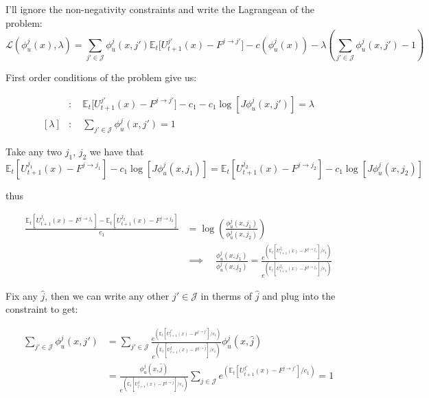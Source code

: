 \documentclass[
  letterpaper,
  DIV=11,
  numbers=noendperiod]{scrreprt}
\begin{document}
I'll ignore the non-negativity constraints and write the Lagrangean of
the problem:
\[\mathcal{L}(\phi^j_u(x), \lambda) =  \sum_{j'\in\mathcal{J}} \phi^j_u(x, j')\mathbb{E}_t\Big[U^{j'}_{t+1}(x) - F^{j \to j'}  \Big] -c(\phi^j_u(x)) - \lambda \left(\sum_{j'\in \mathcal{J}}\phi^j_u(x, j') - 1\right)\]

First order conditions of the problem give us:

\begin{align*}
  [\phi^j_u(x, j')] &:\quad \mathbb{E}_t\Big[U^{j'}_{t+1}(x) - F^{j \to j'}  \Big] - c_1 - c_1 \log[J \phi^j_u(x, j')] = \lambda \\
  [\lambda] &: \quad \sum_{j'\in \mathcal{J}}\phi^j_u(x, j') = 1
\end{align*}

Take any two \(j_1\), \(j_2\) we have that
\[\mathbb{E}_t\left[U^{j_1}_{t+1}(x) - F^{j \to j_1}  \right] - c_1 \log[J \phi^j_u(x, j_1)] = \mathbb{E}_t\left[U^{j_2}_{t+1}(x) - F^{j \to j_2}  \right] - c_1 \log[J \phi^j_u(x, j_2)]\]

thus

\begin{align*}
  \frac{\mathbb{E}_t\left[U^{j_1}_{t+1}(x) - F^{j \to j_1}\right] - \mathbb{E}_t\left[U^{j_2}_{t+1}(x) - F^{j \to j_2}\right]}{c_1} &= \log\left(\frac{ \phi^j_u(x, j_1)}{ \phi^j_u(x, j_2)}\right) \\ 
  &\implies \quad \frac{ \phi^j_u(x, j_1)}{ \phi^j_u(x, j_2)} = \frac{e^{\left(\mathbb{E}_t\left[U^{j_1}_{t+1}(x) - F^{j \to j_1}\right] /c_1\right)}}{e^{\left(\mathbb{E}_t\left[U^{j_2}_{t+1}(x) - F^{j \to j_2}\right] /c_1\right)}}
\end{align*}

Fix any \(\hat{j}\), then we can write any other \(j'\in\mathcal{J}\) in
therms of \(\hat{j}\) and plug into the constraint to get:

\begin{align*}
  \sum_{j'\in \mathcal{J}}\phi^j_u(x, j') &= \sum_{j'\in \mathcal{J}}\frac{e^{\left(\mathbb{E}_t\left[U^{j'}_{t+1}(x) - F^{j \to j'}\right] /c_1\right)}}{e^{\left(\mathbb{E}_t\left[U^{ \hat{j}}_{t+1}(x) - F^{j \to \hat{j}}\right] /c_1\right)}} \phi^j_u(x, \hat{j})\\  &= \frac{\phi^j_u(x, \hat{j})}{e^{\left(\mathbb{E}_t\left[U^{ \hat{j}}_{t+1}(x) - F^{j \to \hat{j}}\right] /c_1\right)}} \sum_{j\in \mathcal{J}}e^{\left(\mathbb{E}_t\left[U^{j'}_{t+1}(x) - F^{j \to j'}\right] /c_1\right)} = 1
\end{align*}
\end{document}
